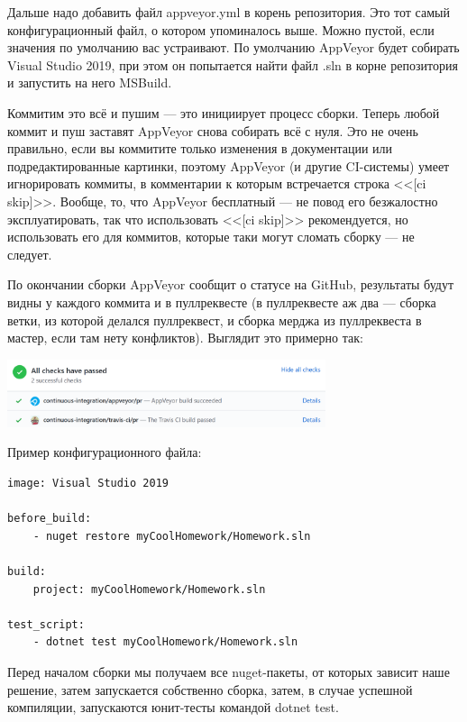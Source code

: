 \documentclass[a5paper]{article}
\begin{document}
Дальше надо добавить файл appveyor.yml в корень репозитория. Это тот самый конфигурационный файл, о котором упоминалось выше. Можно пустой, если значения по умолчанию вас устраивают. По умолчанию AppVeyor будет собирать Visual Studio 2019, при этом он попытается найти файл .sln в корне репозитория и запустить на него MSBuild.

Коммитим это всё и пушим --- это инициирует процесс сборки. Теперь любой коммит и пуш заставят AppVeyor снова собирать всё с нуля. Это не очень правильно, если вы коммитите только изменения в документации или подредактированные картинки, поэтому AppVeyor (и другие CI-системы) умеет игнорировать коммиты, в комментарии к которым встречается строка <<[ci skip]>>. Вообще, то, что AppVeyor бесплатный --- не повод его безжалостно эксплуатировать, так что использовать <<[ci skip]>> рекомендуется, но использовать его для коммитов, которые таки могут сломать сборку --- не следует.

По окончании сборки AppVeyor сообщит о статусе на GitHub, результаты будут видны у каждого коммита и в пуллреквесте (в пуллреквесте аж два --- сборка ветки, из которой делался пуллреквест, и сборка мерджа из пуллреквеста в мастер, если там нету конфликтов). Выглядит это примерно так:

\begin{center}
    \includegraphics[width=0.7\textwidth]{appVeyorSuccess.png}
\end{center}

Пример конфигурационного файла:

\begin{verbatim}
image: Visual Studio 2019

before_build: 
    - nuget restore myCoolHomework/Homework.sln

build: 
    project: myCoolHomework/Homework.sln

test_script: 
    - dotnet test myCoolHomework/Homework.sln
\end{verbatim}

Перед началом сборки мы получаем все nuget-пакеты, от которых зависит наше решение, затем запускается собственно сборка, затем, в случае успешной компиляции, запускаются юнит-тесты командой dotnet test.
\end{document}
